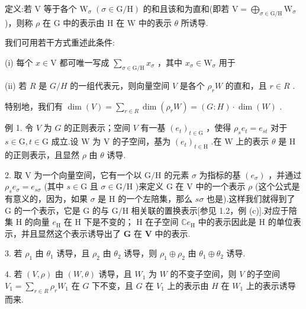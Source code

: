 \documentclass[10pt]{article}
\begin{document}
定义:若 \(\mathrm{V}\) 等于各个 \({\mathrm{W}}_{\sigma } \; \left( {\sigma  \in  \mathrm{G}/\mathrm{H}}\right)\) 的和且该和为直和(即若 \(\mathrm{V} = {\bigoplus }_{\sigma  \in  \mathrm{G}/\mathrm{H}}{\mathrm{W}}_{\sigma }\) )，则称 \(\rho\) 在 \(\mathrm{G}\) 中的表示由 \(\mathrm{H}\) 在 \(\mathrm{W}\) 中的表示 \(\theta\) 所诱导.

我们可用若干方式重述此条件:

(i) 每个 \(x \in  \mathrm{V}\) 都可唯一写成 \(\mathop{\sum }\limits_{{\sigma  \in  \mathrm{G}/\mathrm{H}}}{x}_{\sigma }\) ，其中 \({x}_{\sigma } \in  {\mathrm{W}}_{\sigma }\) 用于

(ii) 若 \(R\) 是 \(G/H\) 的一组代表元，则向量空间 \(V\) 是各个 \({\rho }_{r}W\) 的直和，且 \(r \in  R\) .

特别地，我们有 \(\dim \left( V\right)  = \mathop{\sum }\limits_{{r \in  R}}\dim \left( {{\rho }_{r}W}\right)  = \left( {G : H}\right)  \cdot  \dim \left( W\right)\) .

例 1. 令 \(V\) 为 \(G\) 的正则表示；空间 \(V\) 有一基 \({\left( {e}_{t}\right) }_{t \in  \mathrm{G}}\) ，使得 \({\rho }_{s}{e}_{t} = {e}_{st}\) 对于 \(s \in  \mathrm{G},t \in  \mathrm{G}\) 成立.设 \(\mathrm{W}\) 为 \(\mathrm{V}\) 的子空间，基为 \({\left( {e}_{t}\right) }_{t \in  \mathrm{H}}\) .在 \(\mathrm{W}\) 上的表示 \(\theta\) 是 \(\mathrm{H}\) 的正则表示，且显然 \(\rho\) 由 \(\theta\) 诱导.

2. 取 \(\mathrm{V}\) 为一个向量空间，它有一个以 \(\mathrm{G}/\mathrm{H}\) 的元素 \(\sigma\) 为指标的基 \(\left( {e}_{\sigma }\right)\) ，并通过 \({\rho }_{s}{e}_{\sigma } = {e}_{s\sigma }\) (其中 \(s \in  \mathrm{G}\) 且 \(\sigma  \in  \mathrm{G}/\mathrm{H}\) )来定义 \(\mathrm{G}\) 在 \(\mathrm{V}\) 中的一个表示 \(\rho\) (这个公式是有意义的，因为，如果 \(\sigma\) 是 \(\mathrm{H}\) 的一个左陪集，那么 \({s\sigma }\) 也是).这样我们就得到了 \(\mathrm{G}\) 的一个表示，它是 \(\mathrm{G}\) 的与 \(\mathrm{G}/\mathrm{H}\) 相关联的置换表示[参见 1.2，例 (c)].对应于陪集 \(\mathrm{H}\) 的向量 \({e}_{\mathrm{H}}\) 在 \(\mathrm{H}\) 下是不变的； \(\mathrm{H}\) 在子空间 \(\mathbb{C}{e}_{\mathrm{H}}\) 中的表示因此是 \(\mathrm{H}\) 的单位表示，并且显然这个表示诱导出了 \(\mathbf{G}\) 在 \(\mathbf{V}\) 中的表示.

3. 若 \({\rho }_{1}\) 由 \({\theta }_{1}\) 诱导，且 \({\rho }_{2}\) 由 \({\theta }_{2}\) 诱导，则 \({\rho }_{1} \oplus  {\rho }_{2}\) 由 \({\theta }_{1} \oplus  {\theta }_{2}\) 诱导.

4. 若 \(\left( {V,\rho }\right)\) 由 \(\left( {W,\theta }\right)\) 诱导，且 \({W}_{1}\) 为 \(W\) 的不变子空间，则 \(V\) 的子空间 \({V}_{1} = \mathop{\sum }\limits_{{r \in  R}}{\rho }_{r}{W}_{1}\) 在 \(G\) 下不变，且 \(G\) 在 \({V}_{1}\) 上的表示由 \(H\) 在 \({W}_{1}\) 上的表示诱导而来.
\end{document}
